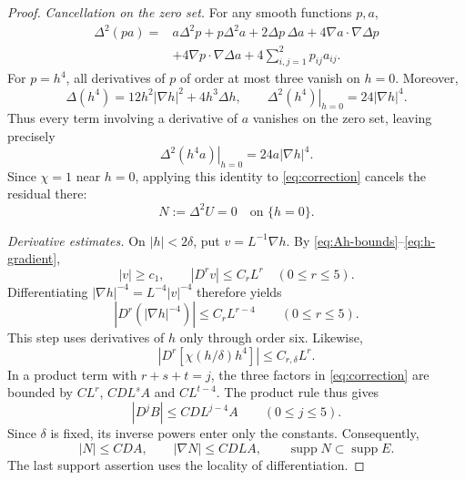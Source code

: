 \documentclass[11pt,a4paper,leqno]{amsart}
\numberwithin{equation}{section}
\theoremstyle{landisplain}
\theoremstyle{landisdefinition}
\theoremstyle{landisremark}
\newcommand{\supp}{\operatorname{supp}}
\begin{document}
\begin{proof}
\smallskip\noindent\emph{Cancellation on the zero set.}
For any smooth functions $p,a$,
\begin{align*}
 \Delta^2(pa)={}&a\Delta^2p+p\Delta^2a
       +2\Delta p\,\Delta a
       +4\nabla a\cdot\nabla\Delta p\\
       &+4\nabla p\cdot\nabla\Delta a
       +4\sum_{i,j=1}^2p_{ij}a_{ij}.
\end{align*}
For $p=h^4$, all derivatives of $p$ of order at most three vanish
on $h=0$. Moreover,
\[
 \Delta(h^4)=12h^2|\nabla h|^2+4h^3\Delta h,
 \qquad
 \left.\Delta^2(h^4)\right|_{h=0}=24|\nabla h|^4.
\]
Thus every term involving a derivative of $a$ vanishes on the
zero set, leaving precisely
\begin{equation}\label{eq:jet}
 \left.\Delta^2(h^4a)\right|_{h=0}=24a|\nabla h|^4.
\end{equation}
Since $\chi=1$ near $h=0$, applying this identity to
\eqref{eq:correction} cancels the residual there:
\begin{equation}\label{eq:N-zero}
 N:=\Delta^2U=0\quad\text{on }\{h=0\}.
\end{equation}

\smallskip\noindent\emph{Derivative estimates.}
On $|h|<2\delta$, put $v=L^{-1}\nabla h$. By
\eqref{eq:Ah-bounds}--\eqref{eq:h-gradient},
\[
 |v|\ge c_1,\qquad |D^rv|\le C_rL^r\quad(0\le r\le5).
\]
Differentiating $|\nabla h|^{-4}=L^{-4}|v|^{-4}$ therefore yields
\begin{equation}\label{eq:inverse-gradient}
 |D^r(|\nabla h|^{-4})|\le C_rL^{r-4}
 \qquad(0\le r\le5).
\end{equation}
This step uses derivatives of $h$ only through order six.
Likewise,
\[
 |D^r[\chi(h/\delta)h^4]|\le C_{r,\delta}L^r.
\]
In a product term with $r+s+t=j$, the three factors in
\eqref{eq:correction} are bounded by $CL^r$, $CDL^sA$ and
$CL^{t-4}$. The product rule thus gives
\begin{equation}\label{eq:Bder}
 |D^jB|\le CD L^{j-4}A\qquad(0\le j\le5).
\end{equation}
Since $\delta$ is fixed, its inverse powers enter only the
constants. Consequently,
\begin{equation}\label{eq:Nd}
 |N|\le CDA,\qquad |\nabla N|\le CDLA,
 \qquad \supp N\subset\supp E.
\end{equation}
The last support assertion uses the locality of differentiation.


\end{proof}
\end{document}
